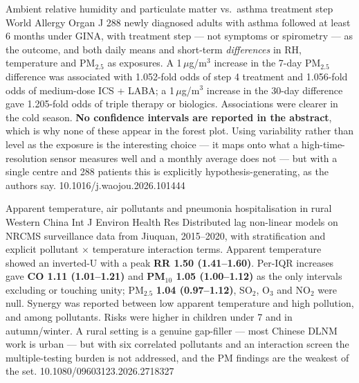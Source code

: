 \documentclass[10pt]{article}
\begin{document}
{Ambient relative humidity and particulate matter vs.\ asthma treatment step}
{World Allergy Organ J}
{288 newly diagnosed adults with asthma followed at least 6 months under GINA, with
treatment step --- not symptoms or spirometry --- as the outcome, and both daily means and
short-term \emph{differences} in RH, temperature and PM$_{2.5}$ as exposures. A
1\,$\mu$g/m$^3$ increase in the 7-day PM$_{2.5}$ difference was associated with 1.052-fold
odds of step 4 treatment and 1.056-fold odds of medium-dose ICS + LABA; a
1\,$\mu$g/m$^3$ increase in the 30-day difference gave 1.205-fold odds of triple therapy
or biologics. Associations were clearer in the cold season. \textbf{No confidence
intervals are reported in the abstract}, which is why none of these appear in the forest
plot. Using variability rather than level as the exposure is the interesting choice ---
it maps onto what a high-time-resolution sensor measures well and a monthly average does
not --- but with a single centre and 288 patients this is explicitly
hypothesis-generating, as the authors say.}
{10.1016/j.waojou.2026.101444}

{Apparent temperature, air pollutants and pneumonia hospitalisation in rural Western China}
{Int J Environ Health Res}
{Distributed lag non-linear models on NRCMS surveillance data from Jiuquan, 2015--2020,
with stratification and explicit pollutant $\times$ temperature interaction terms. Apparent
temperature showed an inverted-U with a peak \textbf{RR 1.50 (1.41--1.60)}. Per-IQR
increases gave \textbf{CO 1.11 (1.01--1.21)} and \textbf{PM$_{10}$ 1.05 (1.00--1.12)} as
the only intervals excluding or touching unity; PM$_{2.5}$ \textbf{1.04 (0.97--1.12)},
SO$_2$, O$_3$ and NO$_2$ were null. Synergy was reported between low apparent temperature
and high pollution, and among pollutants. Risks were higher in children under 7 and in
autumn/winter. A rural setting is a genuine gap-filler --- most Chinese DLNM work is
urban --- but with six correlated pollutants and an interaction screen the multiple-testing
burden is not addressed, and the PM findings are the weakest of the set.}
{10.1080/09603123.2026.2718327}

\end{document}
